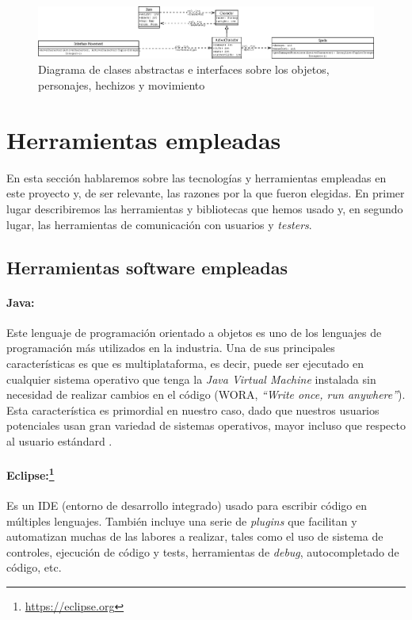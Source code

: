 \begin{figure}
    \includegraphics[width=\textwidth,height=0.15\textwidth]{./img/charactersitems.png}
	\caption{Diagrama de clases abstractas e interfaces sobre los objetos, personajes, hechizos y movimiento}
	\label{fig:charactersitems}
\end{figure}

\section{Herramientas empleadas}

En esta sección hablaremos sobre las tecnologías y herramientas empleadas en este proyecto y, de ser relevante, las razones por la que fueron elegidas. En primer lugar describiremos las herramientas y bibliotecas que hemos usado y, en segundo lugar, las herramientas de comunicación con usuarios y \textit{testers}.

\subsection{Herramientas software empleadas}

\paragraph{Java:} Este lenguaje de programación orientado a objetos es uno de los lenguajes de programación más utilizados en la industria. Una de sus principales características es que es multiplataforma, es decir, puede ser ejecutado en cualquier sistema operativo que tenga la \textit{Java Virtual Machine} instalada sin necesidad de realizar cambios en el código (WORA, \textit{``Write once, run anywhere''}). Esta característica es primordial en nuestro caso, dado que nuestros usuarios potenciales usan gran variedad de sistemas operativos, mayor incluso que respecto al usuario estándard	.

 \paragraph{Eclipse:\protect\footnote{\protect\url{https://eclipse.org}}} Es un IDE (entorno de desarrollo integrado) usado para escribir código en múltiples lenguajes. También incluye una serie de \textit{plugins} que facilitan y automatizan muchas de las labores a realizar, tales como el uso de sistema de controles, ejecución de código y tests, herramientas de \textit{debug}, autocompletado de código, etc.

